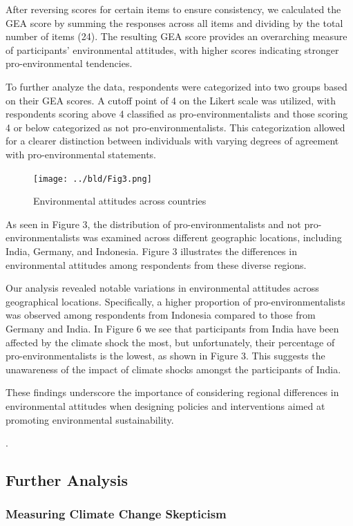 \documentclass[11pt, a4paper, leqno]{article}
\begin{document}
After reversing scores for certain items to ensure consistency, we calculated the GEA score by summing the responses across all items and dividing by the total number of items (24). The resulting GEA score provides an overarching measure of participants' environmental attitudes, with higher scores indicating stronger pro-environmental tendencies. 

To further analyze the data, respondents were categorized into two groups based on their GEA scores. A cutoff point of 4 on the Likert scale was utilized, with respondents scoring above 4 classified as pro-environmentalists and those scoring 4 or below categorized as not pro-environmentalists. This categorization allowed for a clearer distinction between individuals with varying degrees of agreement with pro-environmental statements.

\begin{figure} [h]
  \centering
  \texttt{[image: ../bld/Fig3.png]} 
  \caption{Environmental attitudes across countries}
\end{figure}

As seen in Figure 3, the distribution of pro-environmentalists and not pro-environmentalists was examined across different geographic locations, including India, Germany, and Indonesia. Figure 3 illustrates the differences in environmental attitudes among respondents from these diverse regions.


Our analysis revealed notable variations in environmental attitudes across geographical locations. Specifically, a higher proportion of pro-environmentalists was observed among respondents from Indonesia compared to those from Germany and India. In Figure 6 we see that participants from India have been affected by the climate shock the most, but unfortunately, their percentage of pro-environmentalists is the lowest, as shown in Figure 3. This suggests the unawareness of the impact of climate shocks amongst the participants of India. 

These findings underscore the importance of considering regional differences in environmental attitudes when designing policies and interventions aimed at promoting environmental sustainability. 

.

 
\subsection{Further Analysis}

\subsubsection{Measuring Climate Change Skepticism}
\end{document}

